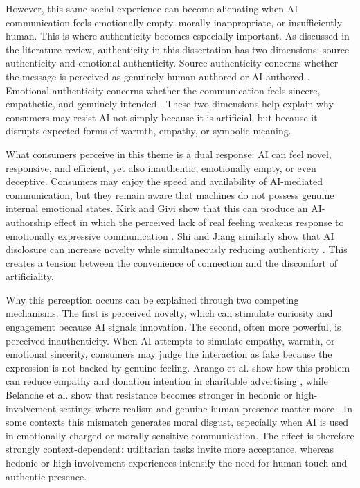 However, this same social experience can become alienating when AI communication feels emotionally empty, morally inappropriate, or insufficiently human. This is where authenticity becomes especially important. As discussed in the literature review, authenticity in this dissertation has two dimensions: source authenticity and emotional authenticity. Source authenticity concerns whether the message is perceived as genuinely human-authored or AI-authored \cite{kirk2025aiauthorship}. Emotional authenticity concerns whether the communication feels sincere, empathetic, and genuinely intended \cite{arango2023charitable}. These two dimensions help explain why consumers may resist AI not simply because it is artificial, but because it disrupts expected forms of warmth, empathy, or symbolic meaning.

What consumers perceive in this theme is a dual response: AI can feel novel, responsive, and efficient, yet also inauthentic, emotionally empty, or even deceptive. Consumers may enjoy the speed and availability of AI-mediated communication, but they remain aware that machines do not possess genuine internal emotional states. Kirk and Givi show that this can produce an AI-authorship effect in which the perceived lack of real feeling weakens response to emotionally expressive communication \cite{kirk2025aiauthorship}. Shi and Jiang similarly show that AI disclosure can increase novelty while simultaneously reducing authenticity \cite{shi2026disclosure}. This creates a tension between the convenience of connection and the discomfort of artificiality.

Why this perception occurs can be explained through two competing mechanisms. The first is perceived novelty, which can stimulate curiosity and engagement because AI signals innovation. The second, often more powerful, is perceived inauthenticity. When AI attempts to simulate empathy, warmth, or emotional sincerity, consumers may judge the interaction as fake because the expression is not backed by genuine feeling. Arango et al. show how this problem can reduce empathy and donation intention in charitable advertising \cite{arango2023charitable}, while Belanche et al. show that resistance becomes stronger in hedonic or high-involvement settings where realism and genuine human presence matter more \cite{belanche2025images}. In some contexts this mismatch generates moral disgust, especially when AI is used in emotionally charged or morally sensitive communication. The effect is therefore strongly context-dependent: utilitarian tasks invite more acceptance, whereas hedonic or high-involvement experiences intensify the need for human touch and authentic presence.

